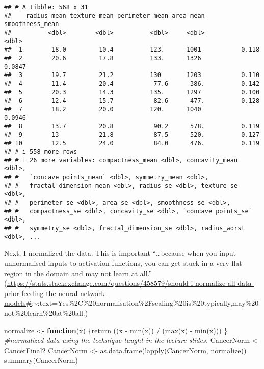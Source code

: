 \documentclass[
]{article}
\newenvironment{Shaded}{\begin{snugshade}}{\end{snugshade}}
\newcommand{\CommentTok}[1]{\textcolor[rgb]{0.56,0.35,0.01}{\textit{#1}}}
\newcommand{\ControlFlowTok}[1]{\textcolor[rgb]{0.13,0.29,0.53}{\textbf{#1}}}
\newcommand{\FunctionTok}[1]{\textcolor[rgb]{0.00,0.00,0.00}{#1}}
\newcommand{\NormalTok}[1]{#1}
\newcommand{\OtherTok}[1]{\textcolor[rgb]{0.56,0.35,0.01}{#1}}
\newcommand{\SpecialCharTok}[1]{\textcolor[rgb]{0.00,0.00,0.00}{#1}}
\begin{document}
\begin{verbatim}
## # A tibble: 568 x 31
##    radius_mean texture_mean perimeter_mean area_mean smoothness_mean
##          <dbl>        <dbl>          <dbl>     <dbl>           <dbl>
##  1        18.0         10.4          123.      1001           0.118 
##  2        20.6         17.8          133.      1326           0.0847
##  3        19.7         21.2          130       1203           0.110 
##  4        11.4         20.4           77.6      386.          0.142 
##  5        20.3         14.3          135.      1297           0.100 
##  6        12.4         15.7           82.6      477.          0.128 
##  7        18.2         20.0          120.      1040           0.0946
##  8        13.7         20.8           90.2      578.          0.119 
##  9        13           21.8           87.5      520.          0.127 
## 10        12.5         24.0           84.0      476.          0.119 
## # i 558 more rows
## # i 26 more variables: compactness_mean <dbl>, concavity_mean <dbl>,
## #   `concave points_mean` <dbl>, symmetry_mean <dbl>,
## #   fractal_dimension_mean <dbl>, radius_se <dbl>, texture_se <dbl>,
## #   perimeter_se <dbl>, area_se <dbl>, smoothness_se <dbl>,
## #   compactness_se <dbl>, concavity_se <dbl>, `concave points_se` <dbl>,
## #   symmetry_se <dbl>, fractal_dimension_se <dbl>, radius_worst <dbl>, ...
\end{verbatim}

Next, I normalized the data. This is important ``\ldots because when you
input unnormalised inputs to activation functions, you can get stuck in
a very flat region in the domain and may not learn at all.''
(\url{https://stats.stackexchange.com/questions/458579/should-i-normalize-all-data-prior-feeding-the-neural-network-models\#}:\textasciitilde:text=Yes\%2C\%20normalisation\%2Fscaling\%20is\%20typically,may\%20not\%20learn\%20at\%20all.)

\begin{Shaded}
\begin{Highlighting}[]
\NormalTok{normalize }\OtherTok{\textless{}{-}} \ControlFlowTok{function}\NormalTok{(x) \{}\FunctionTok{return}\NormalTok{ ((x }\SpecialCharTok{{-}} \FunctionTok{min}\NormalTok{(x)) }\SpecialCharTok{/}\NormalTok{ (}\FunctionTok{max}\NormalTok{(x) }\SpecialCharTok{{-}} \FunctionTok{min}\NormalTok{(x))) \} }\CommentTok{\#normalized data using the technique taught in the lecture slides.}
\NormalTok{CancerNorm }\OtherTok{\textless{}{-}}\NormalTok{ CancerFinal2}
\NormalTok{CancerNorm }\OtherTok{\textless{}{-}} \FunctionTok{as.data.frame}\NormalTok{(}\FunctionTok{lapply}\NormalTok{(CancerNorm, normalize))}
\FunctionTok{summary}\NormalTok{(CancerNorm)}
\end{Highlighting}
\end{Shaded}
\end{document}
